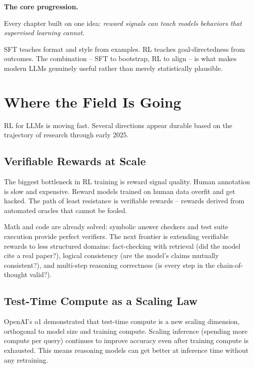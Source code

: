 \begin{chapterenv}
\begin{infobox}
\textbf{The core progression.}

Every chapter built on one idea: \textit{reward signals can teach models behaviors that supervised learning cannot}.

SFT teaches format and style from examples. RL teaches goal-directedness from outcomes. The combination -- SFT to bootstrap, RL to align -- is what makes modern LLMs genuinely useful rather than merely statistically plausible.
\end{infobox}

\section{Where the Field Is Going}

RL for LLMs is moving fast. Several directions appear durable based on the trajectory of research through early 2025.

\subsection{Verifiable Rewards at Scale}

The biggest bottleneck in RL training is reward signal quality. Human annotation is slow and expensive. Reward models trained on human data overfit and get hacked. The path of least resistance is verifiable rewards -- rewards derived from automated oracles that cannot be fooled.

Math and code are already solved: symbolic answer checkers and test suite execution provide perfect verifiers. The next frontier is extending verifiable rewards to less structured domains: fact-checking with retrieval (did the model cite a real paper?), logical consistency (are the model's claims mutually consistent?), and multi-step reasoning correctness (is every step in the chain-of-thought valid?).

\subsection{Test-Time Compute as a Scaling Law}

OpenAI's o1 demonstrated that test-time compute is a new scaling dimension, orthogonal to model size and training compute. Scaling inference (spending more compute per query) continues to improve accuracy even after training compute is exhausted. This means reasoning models can get better at inference time without any retraining.


\end{chapterenv}
